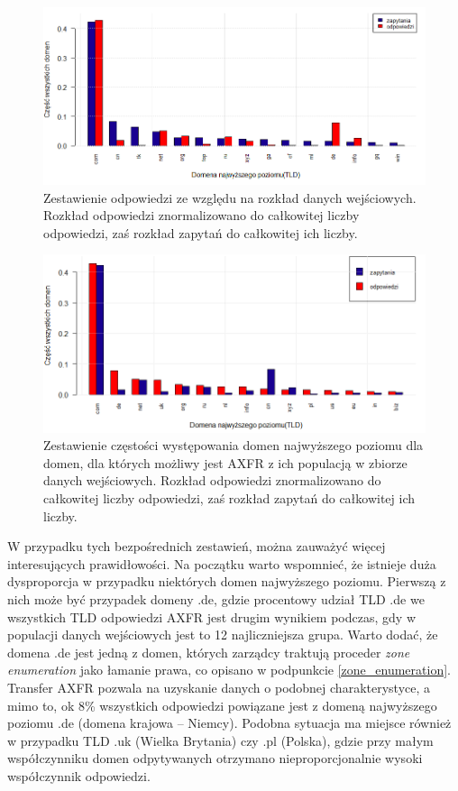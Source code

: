 \begin{figure}[h!]
	\centering
	\includegraphics[width=1.0\textwidth]{image/req_to_resp_no_title}
	\caption{Zestawienie odpowiedzi ze względu na rozkład danych wejściowych. Rozkład odpowiedzi znormalizowano do całkowitej liczby
	odpowiedzi, zaś rozkład zapytań do całkowitej ich liczby.}
	\label{req_to_resp}
\end{figure}

\begin{figure}[h!]
	\centering
	\includegraphics[width=1.0\textwidth]{image/resp_to_req_no_title}
	\caption{Zestawienie częstości występowania domen najwyższego poziomu dla domen, dla których możliwy jest AXFR z ich populacją
	w zbiorze danych wejściowych. Rozkład odpowiedzi znormalizowano do całkowitej liczby
	odpowiedzi, zaś rozkład zapytań do całkowitej ich liczby.}
	\label{resp_to_req}
\end{figure}

W przypadku tych bezpośrednich zestawień, można zauważyć więcej interesujących prawidłowości. Na początku warto wspomnieć, że
istnieje duża dysproporcja w przypadku niektórych domen najwyższego poziomu. Pierwszą z nich może być przypadek domeny .de,
gdzie procentowy udział TLD .de we wszystkich TLD odpowiedzi AXFR jest drugim wynikiem podczas, gdy w populacji danych wejściowych
jest to 12 najliczniejsza grupa. Warto dodać, że domena .de jest jedną z domen, których zarządcy traktują proceder
\textit{zone enumeration} jako łamanie prawa, co opisano w podpunkcie \ref{zone_enumeration}. Transfer AXFR pozwala na uzyskanie
danych o podobnej charakterystyce, a mimo to, ok 8\% wszystkich odpowiedzi powiązane jest z domeną najwyższego poziomu .de
(domena krajowa -- Niemcy). Podobna sytuacja ma miejsce również w przypadku TLD .uk (Wielka Brytania) czy .pl (Polska),
gdzie przy małym współczynniku domen odpytywanych otrzymano nieproporcjonalnie wysoki współczynnik odpowiedzi.

